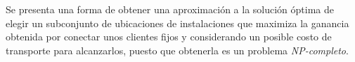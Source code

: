
Se presenta una forma de obtener una aproximación a la solución óptima de elegir un subconjunto de ubicaciones de instalaciones que maximiza la ganancia obtenida por conectar unos clientes fijos y considerando un posible costo de transporte para alcanzarlos, puesto que obtenerla es un problema \emph{NP-completo}.



